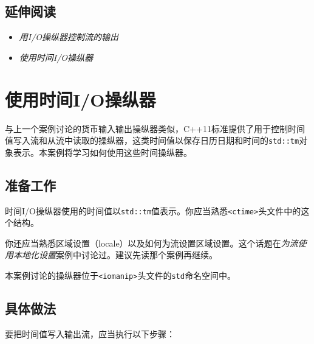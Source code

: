 
\subsection{延伸阅读}



\begin{itemize}
\item \textit{用I/O操纵器控制流的输出}



\item \textit{使用时间I/O操纵器}

\end{itemize}



\section{使用时间I/O操纵器}



与上一个案例讨论的货币输入输出操纵器类似，C++11标准提供了用于控制时间值写入流和从流中读取的操纵器，这类时间值以保存日历日期和时间的\texttt{std::\allowbreak{}tm}对象表示。本案例将学习如何使用这些时间操纵器。



\subsection{准备工作}



时间I/O操纵器使用的时间值以\texttt{std::\allowbreak{}tm}值表示。你应当熟悉\texttt{<\allowbreak{}ctime>}头文件中的这个结构。



你还应当熟悉区域设置（locale）以及如何为流设置区域设置。这个话题在\textit{为流使用本地化设置}案例中讨论过。建议先读那个案例再继续。



本案例讨论的操纵器位于\texttt{<\allowbreak{}iomanip>}头文件的\texttt{std}命名空间中。



\subsection{具体做法}



要把时间值写入输出流，应当执行以下步骤：


